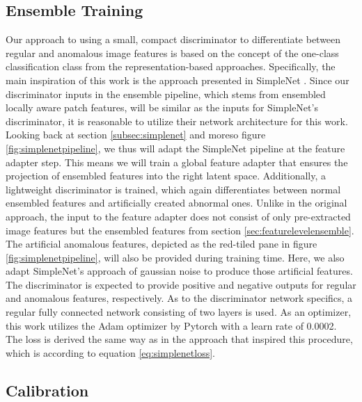 \subsection{Ensemble Training}
\label{sec:discriminator}
Our approach to using a small, compact discriminator to differentiate between regular and anomalous image features is based on the concept of 
the one-class classification class from the representation-based approaches. Specifically, the main inspiration of this work is the approach 
presented in SimpleNet \cite{liu2023simplenet}. Since our discriminator inputs in the ensemble pipeline, which stems from ensembled locally aware patch features, 
will be similar as 
the inputs for SimpleNet's discriminator, it is reasonable to utilize their network architecture for this work. Looking back at section 
\ref{subsec:simplenet} and moreso figure \ref{fig:simplenetpipeline}, we thus will adapt the SimpleNet pipeline at the feature adapter step. 
This means we will train a global feature adapter that ensures the projection of ensembled features into the right latent space. Additionally, a lightweight discriminator 
is trained, which again differentiates between normal ensembled features and artificially created abnormal ones. Unlike in the original approach, the input to the feature adapter 
does not consist of only pre-extracted image features 
but the ensembled features from section \ref{sec:featurelevelensemble}. The artificial anomalous features, 
depicted as the red-tiled pane in figure \ref{fig:simplenetpipeline}, will also be provided during training time. Here, we also adapt SimpleNet's approach of 
gaussian noise to produce those artificial features. %
The discriminator is expected to provide positive and negative outputs for regular and anomalous features, respectively.
As to the discriminator network specifics, a regular fully connected network consisting of two layers is used. As an optimizer, this work utilizes the 
Adam optimizer by Pytorch with a learn rate of 0.0002. The loss is derived the same way as in the approach that inspired this procedure, 
which is according to equation \ref{eq:simplenetloss}.


\subsection{Calibration}
\label{sec:Calibration}


